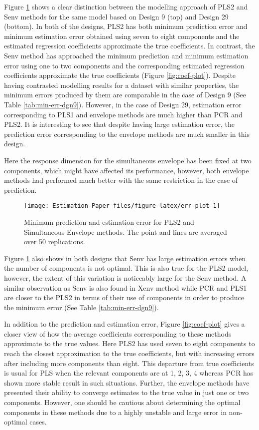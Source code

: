 \documentclass[12pt,3p,authoryear]{elsarticle}
\begin{document}
Figure \ref{fig:err-plot} shows a clear distinction between the
modelling approach of PLS2 and Senv methods for the same model based on
Design 9 (top) and Design 29 (bottom). In both of the designs, PLS2 has
both minimum prediction error and minimum estimation error obtained
using seven to eight components and the estimated regression
coefficients approximate the true coefficients. In contrast, the Senv
method has approached the minimum prediction and minimum estimation
error using one to two components and the corresponding estimated
regression coefficients approximate the true coefficients (Figure
\ref{fig:coef-plot}). Despite having contrasted modelling results for a
dataset with similar properties, the minimum errors produced by them are
comparable in the case of Design 9 (See Table \ref{tab:min-err-dgn9}).
However, in the case of Design 29, estimation error corresponding to
PLS1 and envelope methods are much higher than PCR and PLS2. It is
interesting to see that despite having large estimation error, the
prediction error corresponding to the envelope methods are much smaller
in this design.

Here the response dimension for the simultaneous envelope has been fixed
at two components, which might have affected its performance, however,
both envelope methods had performed much better with the same
restriction in the case of prediction.

\begin{figure}
\texttt{[image: Estimation-Paper\_files/figure-latex/err-plot-1]} \caption{Minimum prediction and estimation error for PLS2 and Simultaneous Envelope methods. The point and lines are averaged over 50 replications.}\label{fig:err-plot}
\end{figure}

Figure \ref{fig:err-plot} also shows in both designs that Senv has large
estimation errors when the number of components is not optimal. This is
also true for the PLS2 model, however, the extent of this variation is
noticeably large for the Senv method. A similar observation as Senv is
also found in Xenv method while PCR and PLS1 are closer to the PLS2 in
terms of their use of components in order to produce the minimum error
(See Table \ref{tab:min-err-dgn9}).

In addition to the prediction and estimation error, Figure
\ref{fig:coef-plot} gives a closer view of how the average coefficients
corresponding to these methods approximate to the true values. Here PLS2
has used seven to eight components to reach the closest approximation to
the true coefficients, but with increasing errors after including more
components than eight. This departure from true coefficients is usual
for PLS when the relevant components are at 1, 2, 3, 4 whereas PCR has
shown more stable result in such situations. Further, the envelope
methods have presented their ability to converge estimates to the true
value in just one or two components. However, one should be cautious
about determining the optimal components in these methods due to a
highly unstable and large error in non-optimal cases.
\end{document}

